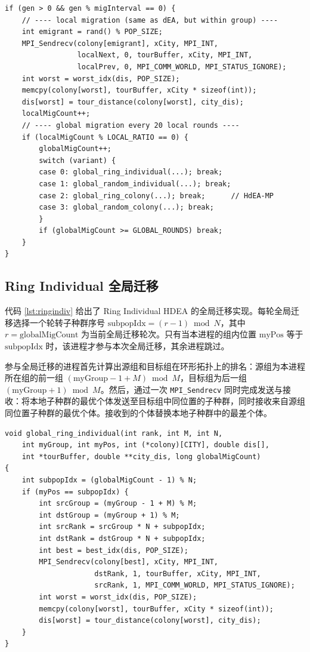 \begin{lstlisting}[caption={HdEA 局部迁移 + 全局迁移调度},label={lst:hdea}]
if (gen > 0 && gen % migInterval == 0) {
    // ---- local migration (same as dEA, but within group) ----
    int emigrant = rand() % POP_SIZE;
    MPI_Sendrecv(colony[emigrant], xCity, MPI_INT,
                 localNext, 0, tourBuffer, xCity, MPI_INT,
                 localPrev, 0, MPI_COMM_WORLD, MPI_STATUS_IGNORE);
    int worst = worst_idx(dis, POP_SIZE);
    memcpy(colony[worst], tourBuffer, xCity * sizeof(int));
    dis[worst] = tour_distance(colony[worst], city_dis);
    localMigCount++;
    // ---- global migration every 20 local rounds ----
    if (localMigCount % LOCAL_RATIO == 0) {
        globalMigCount++;
        switch (variant) {
        case 0: global_ring_individual(...); break;
        case 1: global_random_individual(...); break;
        case 2: global_ring_colony(...); break;      // HdEA-MP
        case 3: global_random_colony(...); break;
        }
        if (globalMigCount >= GLOBAL_ROUNDS) break;
    }
}
\end{lstlisting}

\subsection{Ring Individual 全局迁移}

代码 \ref{lst:ringindiv} 给出了 Ring Individual HDEA 的全局迁移实现。每轮全局迁移选择一个轮转子种群序号 $\text{subpopIdx} = (r-1) \bmod N$，其中 $r = \text{globalMigCount}$ 为当前全局迁移轮次。只有当本进程的组内位置 $\text{myPos}$ 等于 $\text{subpopIdx}$ 时，该进程才参与本次全局迁移，其余进程跳过。

参与全局迁移的进程首先计算出源组和目标组在环形拓扑上的排名：源组为本进程所在组的前一组 $(\text{myGroup}-1+M) \bmod M$，目标组为后一组 $(\text{myGroup}+1) \bmod M$。然后，通过一次 \texttt{MPI\_Sendrecv} 同时完成发送与接收：将本地子种群的最优个体发送至目标组中同位置的子种群，同时接收来自源组同位置子种群的最优个体。接收到的个体替换本地子种群中的最差个体。

\begin{lstlisting}[caption={Ring Individual 全局迁移（每轮 1 个子种群，最优迁出—最差替换）},label={lst:ringindiv}]
void global_ring_individual(int rank, int M, int N,
    int myGroup, int myPos, int (*colony)[CITY], double dis[],
    int *tourBuffer, double **city_dis, long globalMigCount)
{
    int subpopIdx = (globalMigCount - 1) % N;
    if (myPos == subpopIdx) {
        int srcGroup = (myGroup - 1 + M) % M;
        int dstGroup = (myGroup + 1) % M;
        int srcRank = srcGroup * N + subpopIdx;
        int dstRank = dstGroup * N + subpopIdx;
        int best = best_idx(dis, POP_SIZE);
        MPI_Sendrecv(colony[best], xCity, MPI_INT,
                     dstRank, 1, tourBuffer, xCity, MPI_INT,
                     srcRank, 1, MPI_COMM_WORLD, MPI_STATUS_IGNORE);
        int worst = worst_idx(dis, POP_SIZE);
        memcpy(colony[worst], tourBuffer, xCity * sizeof(int));
        dis[worst] = tour_distance(colony[worst], city_dis);
    }
}
\end{lstlisting}


